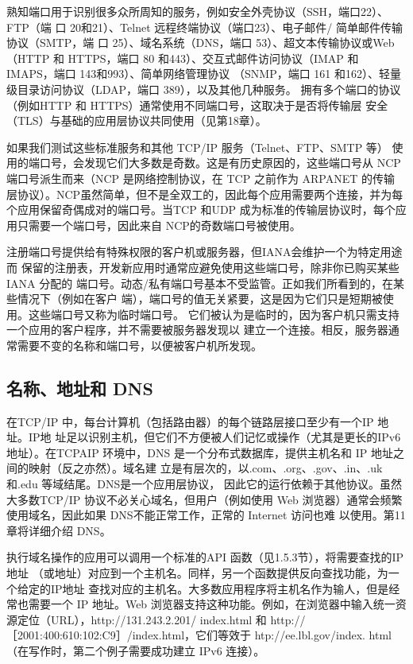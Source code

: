 熟知端口用于识别很多众所周知的服务，例如安全外壳协议（SSH，端口22）、FTP（端
口 20和21）、Telnet 远程终端协议（端口23）、电子邮件/ 简单邮件传输协议（SMTP，端
口 25）、域名系统（DNS，端口 53）、超文本传输协议或Web（HTTP 和 HTTPS，端口 80
和443）、交互式邮件访问协议（IMAP 和 IMAPS，端口 143和993）、简单网络管理协议
（SNMP，端口 161 和162）、轻量级目录访问协议（LDAP，端口 389），以及其他几种服务。
拥有多个端口的协议（例如HTTP 和 HTTPS）通常使用不同端口号，这取决于是否将传输层
安全（TLS）与基础的应用层协议共同使用（见第18章）。

\begin{tcolorbox}
  如果我们测试这些标准服务和其他 TCP/IP 服务（Telnet、FTP、SMTP 等）
  使用的端口号，会发现它们大多数是奇数。这是有历史原因的，这些端口号从
  NCP 端口号派生而来（NCP 是网络控制协议，在 TCP 之前作为 ARPANET 的传输
  层协议）。NCP虽然简单，但不是全双工的，因此每个应用需要两个连接，并为每
  个应用保留奇偶成对的端口号。当TCP 和UDP 成为标准的传输层协议时，每个应
  用只需要一个端口号，因此来自 NCP的奇数端口号被使用。
\end{tcolorbox}
注册端口号提供给有特殊权限的客户机或服务器，但IANA会维护一个为特定用途而
保留的注册表，开发新应用时通常应避免使用这些端口号，除非你已购买某些IANA 分配的
端口号。动态/私有端口号基本不受监管。正如我们所看到的，在某些情况下（例如在客户
端），端口号的值无关紧要，这是因为它们只是短期被使用。这些端口号又称为临时端口号。
它们被认为是临时的，因为客户机只需支持一个应用的客户程序，并不需要被服务器发现以
建立一个连接。相反，服务器通常需要不变的名称和端口号，以便被客户机所发现。

\subsection{名称、地址和 DNS}
在TCP/IP 中，每台计算机（包括路由器）的每个链路层接口至少有一个IP 地址。IP地
址足以识别主机，但它们不方便被人们记忆或操作（尤其是更长的IPv6地址）。在TCPAIP
环境中，DNS 是一个分布式数据库，提供主机名和 IP 地址之间的映射（反之亦然）。域名建
立是有层次的，以.com、.org、.gov、.in、.uk 和.edu 等域结尾。DNS是一个应用层协议，
因此它的运行依赖于其他协议。虽然大多数TCP/IP 协议不必关心域名，但用户（例如使用
Web 浏览器）通常会频繁使用域名，因此如果 DNS不能正常工作，正常的 Internet 访问也难
以使用。第11 章将详细介绍 DNS。

执行域名操作的应用可以调用一个标准的API 函数（见1.5.3节），将需要查找的IP地址
（或地址）对应到一个主机名。同样，另一个函数提供反向查找功能，为一个给定的IP地址
查找对应的主机名。大多数应用程序将主机名作为输人，但是经常也需要一个 IP 地址。Web
浏览器支持这种功能。例如，在浏览器中输入统一资源定位（URL），http://131.243.2.201/
index.html 和 http://［2001:400:610:102:C9］/index.html，它们等效于
htp://ee.lbl.gov/index.
html（在写作时，第二个例子需要成功建立 IPv6 连接）。

